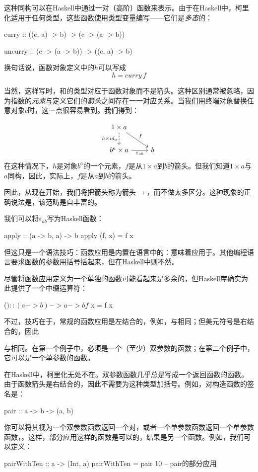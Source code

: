 \documentclass[DaoFP]{subfiles}
\begin{document}
这种同构可以在Haskell中通过一对（高阶）函数来表示。由于在Haskell中，柯里化适用于任何类型，这些函数使用类型变量编写——它们是\emph{多态}的：
\begin{haskell}
curry   :: ((c, a) -> b)   -> (c -> (a -> b))
\end{haskell}

\begin{haskell}
uncurry :: (c -> (a -> b)) -> ((c, a) -> b)
\end{haskell}
换句话说，函数对象定义中的$h$可以写成
\[ h = curry\, f \]

当然，这样写时，和的类型对应于函数对象而不是箭头。这种区别通常被忽略，因为指数的\emph{元素}与定义它们的\emph{箭头}之间存在一一对应关系。当我们用终端对象替换任意对象$c$时，这一点很容易看到。我们得到：

\[
 \begin{tikzcd}
 1 \times a
 \arrow[d, dashed, "h \times id_a"']
 \arrow[rd, "f"]
 \\
 b^a \times a
 \arrow[r, "\varepsilon_{a b}"']
& b
 \end{tikzcd}
\]
在这种情况下，$h$是对象$b^a$的一个元素，$f$是从$1 \times a$到$b$的箭头。但我们知道$1 \times a$与$a$同构，因此，实际上，$f$是从$a$到$b$的箭头。

因此，从现在开始，我们将把箭头\hask{->}称为箭头$\to$，而不做太多区分。这种现象的正确说法是，该范畴是自丰富的。

我们可以将$\varepsilon_{a b}$写为Haskell函数：
\begin{haskell}
apply :: (a -> b, a) -> b
apply (f, x) = f x
\end{haskell}
但这只是一个语法技巧：函数应用是内置在语言中的：意味着应用于。其他编程语言要求函数的参数用括号括起来，但在Haskell中则不然。

尽管将函数应用定义为一个单独的函数可能看起来是多余的，但Haskell库确实为此提供了一个中缀运算符\hask{$}：
\begin{haskell}
($) :: (a -> b) -> a -> b
f $ x = f x
\end{haskell}
不过，技巧在于，常规的函数应用是左结合的，例如，与相同；但美元符号是右结合的，因此
与相同。在第一个例子中，必须是一个（至少）双参数的函数；在第二个例子中，它可以是一个单参数的函数。

在Haskell中，柯里化无处不在。双参数函数几乎总是写成一个返回函数的函数。由于函数箭头\hask{->}是右结合的，因此不需要为这种类型加括号。例如，对构造函数的签名是：
\begin{haskell}
pair :: a -> b -> (a, b)
\end{haskell}
你可以将其视为一个双参数函数返回一个对，或者一个单参数函数返回一个单参数函数，。这样，部分应用这样的函数是可以的，结果是另一个函数。例如，我们可以定义：
\begin{haskell}
pairWithTen :: a -> (Int, a)
pairWithTen = pair 10 -- pair的部分应用
\end{haskell}
\end{document}
